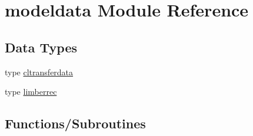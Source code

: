 \hypertarget{namespacemodeldata}{}\section{modeldata Module Reference}
\label{namespacemodeldata}
\subsection*{Data Types}
\begin{DoxyCompactItemize}
\item 
type \mbox{\hyperlink{structmodeldata_1_1cltransferdata}{cltransferdata}}
\item 
type \mbox{\hyperlink{structmodeldata_1_1limberrec}{limberrec}}
\end{DoxyCompactItemize}
\subsection*{Functions/\+Subroutines}
